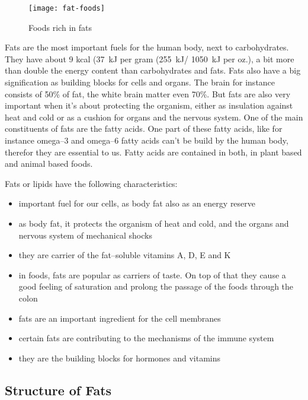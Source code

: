 \documentclass[../main.tex]{subfiles}
\begin{document}
\begin{figure}[htb!]
\centering
  \texttt{[image: fat-foods]}
  \caption{Foods rich in fats~\cite{FatFoods}}
\end{figure}

Fats are the most important fuels for the human body, next to carbohydrates.
They have about 9 kcal (\SI{37}{\kilo\joule} per gram (\SI{255}{\kilo\joule}/ \SI{1050}{kJ} per oz.), a bit more than double the energy content than carbohydrates and fats.
Fats also have a big signification as building blocks for cells and organs.
The brain for instance consists of 50\% of fat, the white brain matter even 70\%.
But fats are also very important when it's about protecting the organism,
either as insulation against heat and cold or as a cushion for organs and the nervous system.
One of the main constituents of fats are the fatty acids.
One part of these fatty acids, like for instance omega--3 and omega--6 fatty acids
can't be build by the human body, therefor they are essential to us.
Fatty acids are contained in both, in plant based and animal based foods.

Fats or lipids have the following characteristics:
\begin{itemize}
\item important fuel for our cells, as body fat also as an energy reserve
\item as body fat, it protects the organism of heat and cold, and the organs and nervous system of mechanical shocks
\item they are carrier of the fat--soluble vitamins A, D, E and K
\item in foods, fats are popular as carriers of taste. On top of that
  they cause a good feeling of saturation and prolong the passage of the foods through the colon
\item fats are an important ingredient for the cell membranes
\item certain fats are contributing to the mechanisms of the immune system
\item they are the building blocks for hormones and vitamins 
\end{itemize}

\subsection{Structure of Fats}
\end{document}
